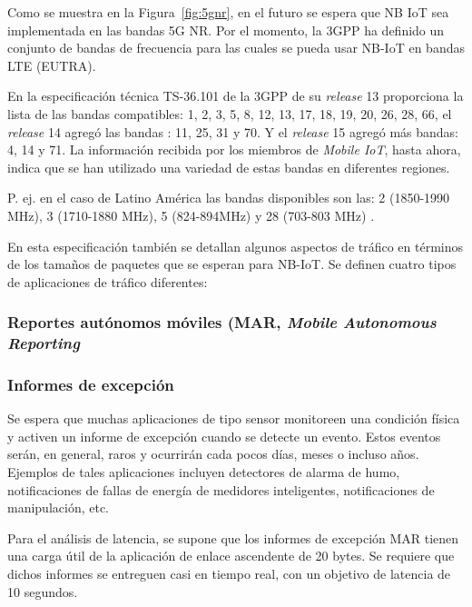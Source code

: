 Como se muestra en la Figura~\ref{fig:5gnr}, en el futuro se espera que NB IoT sea implementada en las bandas 5G NR. Por el momento, la 3GPP ha definido un conjunto de bandas de frecuencia para las cuales se pueda usar NB-IoT en bandas LTE (EUTRA). \newline

En la especificación técnica TS-36.101 de la 3GPP de su \textit{release} 13 proporciona la lista de las bandas compatibles: 1, 2, 3, 5, 8, 12, 13, 17, 18, 19, 20, 26, 28, 66, el \textit{release} 14 agregó las bandas : 11, 25, 31 y 70. Y el \textit{release} 15 agregó más bandas: 4, 14 y 71. La información recibida por los miembros de \textit{Mobile IoT}, hasta ahora, indica que se han utilizado una variedad de estas bandas en diferentes regiones\parencite{NBIoTDeploymentGSMA}.\newline

P. ej. en el caso de Latino América las bandas disponibles son las: 2 (1850-1990 MHz), 3 (1710-1880 MHz), 5 (824-894MHz) y 28 (703-803 MHz) \parencite{NBIoTDeploymentGSMA}.\newline

En esta especificación también se detallan algunos aspectos de tráfico en términos de los tamaños de paquetes que se esperan para NB-IoT. Se definen cuatro tipos de aplicaciones de tráfico diferentes:

\subsubsection{Reportes autónomos móviles (MAR, \textit{Mobile Autonomous Reporting}}
\subsubsection{Informes de excepción}
Se espera que muchas aplicaciones de tipo sensor monitoreen una condición física y activen un informe de excepción cuando se detecte un evento. Estos eventos serán, en general, raros y ocurrirán cada pocos días, meses o incluso años. Ejemplos de tales aplicaciones incluyen detectores de alarma de humo, notificaciones de fallas de energía de medidores inteligentes, notificaciones de manipulación, etc.\newline

Para el análisis de latencia, se supone que los informes de excepción MAR tienen una carga útil de la aplicación de enlace ascendente de 20 bytes. Se requiere que dichos informes se entreguen casi en tiempo real, con un objetivo de latencia de 10 segundos.\newline

